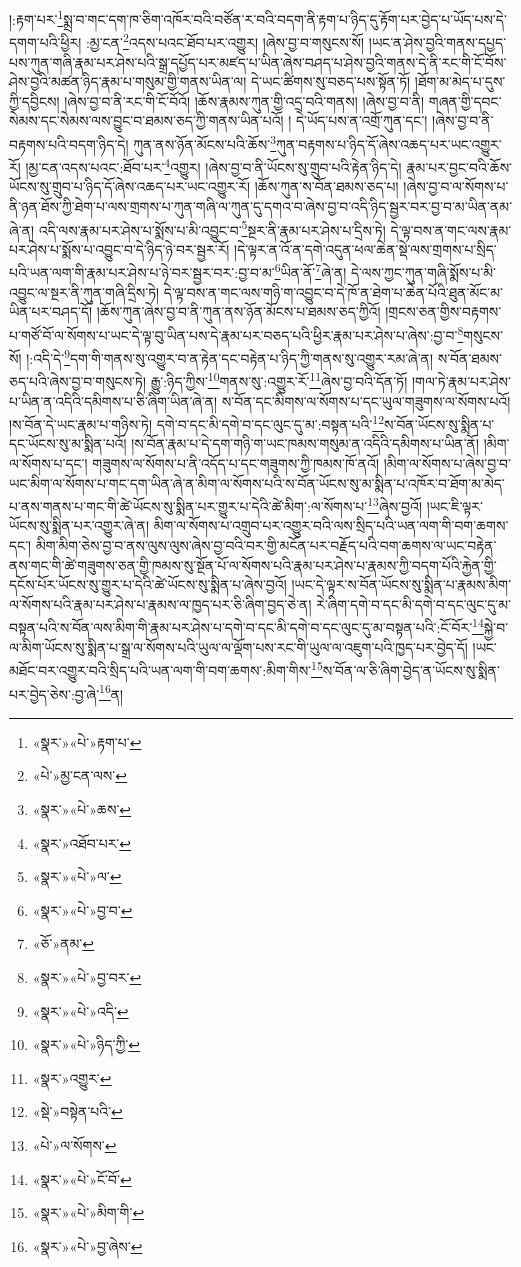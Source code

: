 །:རྟག་པར་\footnote{«སྣར་»«པེ་»རྟག་པ་}སྨྲ་བ་གང་དག་ཁ་ཅིག་འཁོར་བའི་བཙོན་ར་བའི་བདག་ནི་རྟག་པ་ཉིད་དུ་རྟོག་པར་བྱེད་པ་ཡོད་པས་དེ་དགག་པའི་ཕྱིར། :མྱ་ངན་\footnote{«པེ་»མྱ་ངན་ལས་}འདས་པའང་ཐོབ་པར་འགྱུར། །ཞེས་བྱ་བ་གསུངས་སོ། །ཡང་ན་ཤེས་བྱའི་གནས་དཔྱད་པས་ཀུན་གཞི་རྣམ་པར་ཤེས་པའི་སྒྲ་དཔྱོད་པར་མཛད་པ་ཡིན་ཞེས་བཤད་པ་ཤེས་བྱའི་གནས་དེ་ནི་རང་གི་ངོ་བོས་ཤེས་བྱའི་མཚན་ཉིད་རྣམ་པ་གསུམ་གྱི་གནས་ཡིན་ལ། དེ་ཡང་ཚིགས་སུ་བཅད་པས་སྟོན་ཏོ། །ཐོག་མ་མེད་པ་དུས་ཀྱི་དབྱིངས། །ཞེས་བྱ་བ་ནི་རང་གི་ངོ་བོའོ། །ཆོས་རྣམས་ཀུན་གྱི་འདྲ་བའི་གནས། །ཞེས་བྱ་བ་ནི། གཞན་གྱི་དབང་སེམས་དང་སེམས་ལས་བྱུང་བ་ཐམས་ཅད་ཀྱི་གནས་ཡིན་པའོ། །
དེ་ཡོད་པས་ན་འགྲོ་ཀུན་དང་། །ཞེས་བྱ་བ་ནི་བརྟགས་པའི་བདག་ཉིད་དེ། ཀུན་ནས་ཉོན་མོངས་པའི་ཆོས་\footnote{«སྣར་»«པེ་»ཆས་}ཀུན་བརྟགས་པ་ཉིད་དོ་ཞེས་འཆད་པར་ཡང་འགྱུར་རོ། །མྱ་ངན་འདས་པའང་:ཐོབ་པར་\footnote{«སྣར་»འཐོབ་པར་}འགྱུར། །ཞེས་བྱ་བ་ནི་ཡོངས་སུ་གྲུབ་པའི་རྟེན་ཉིད་དེ། རྣམ་པར་བྱང་བའི་ཆོས་ཡོངས་སུ་གྲུབ་པ་ཉིད་དོ་ཞེས་འཆད་པར་ཡང་འགྱུར་རོ། །ཆོས་ཀུན་ས་བོན་ཐམས་ཅད་པ། །ཞེས་བྱ་བ་ལ་སོགས་པ་ནི་ཉན་ཐོས་ཀྱི་ཐེག་པ་ལས་གྲགས་པ་ཀུན་གཞི་ལ་ཀུན་དུ་དགའ་བ་ཞེས་བྱ་བ་འདི་ཉིད་སྦྱར་བར་བྱ་བ་མ་ཡིན་ནམ་ཞེ་ན། འདི་ལས་རྣམ་པར་ཤེས་པ་སྨོས་པ་མི་འབྱུང་བ་\footnote{«སྣར་»«པེ་»ལ་}སྔར་ནི་རྣམ་པར་ཤེས་པ་དྲིས་ཏེ། དེ་ལྟ་བས་ན་གང་ལས་རྣམ་པར་ཤེས་པ་སྨོས་པ་འབྱུང་བ་དེ་ཉིད་ཉེ་བར་སྦྱར་རོ། །དེ་ལྟར་ན་འོ་ན་དགེ་འདུན་ཕལ་ཆེན་སྡེ་ལས་གྲགས་པ་སྲིད་པའི་ཡན་ལག་གི་རྣམ་པར་ཤེས་པ་ཉེ་བར་སྦྱར་བར་:བྱ་བ་མ་\footnote{«སྣར་»«པེ་»བྱ་བ་}ཡིན་ནོ་\footnote{«ཅོ་»ནམ་}ཞེ་ན། དེ་ལས་ཀྱང་ཀུན་གཞི་སྨོས་པ་མི་འབྱུང་ལ་སྔར་ནི་ཀུན་གཞི་དྲིས་ཏེ། དེ་ལྟ་བས་ན་གང་ལས་གཉི་ག་འབྱུང་བ་དེ་ཁོ་ན་ཐེག་པ་ཆེན་པོའི་ཐུན་མོང་མ་ཡིན་པར་བཤད་དོ། །ཆོས་ཀུན་ཞེས་བྱ་བ་ནི་ཀུན་ནས་ཉོན་མོངས་པ་ཐམས་ཅད་ཀྱིའོ། །གྲངས་ཅན་གྱིས་བརྟགས་པ་གཙོ་བོ་ལ་སོགས་པ་ཡང་དེ་ལྟ་བུ་ཡིན་པས་དེ་རྣམ་པར་བཅད་པའི་ཕྱིར་རྣམ་པར་ཤེས་པ་ཞེས་:བྱ་བ་\footnote{«སྣར་»«པེ་»བྱ་བར་}གསུངས་སོ། །:འདི་དེ་\footnote{«སྣར་»«པེ་»འདི་}དག་གི་གནས་སུ་འགྱུར་བ་ན་རྟེན་དང་བརྟེན་པ་ཉིད་ཀྱི་གནས་སུ་འགྱུར་རམ་ཞེ་ན། ས་བོན་ཐམས་ཅད་པའི་ཞེས་བྱ་བ་གསུངས་ཏེ། རྒྱུ་:ཉིད་ཀྱིས་\footnote{«སྣར་»«པེ་»ཉིད་ཀྱི་}གནས་སུ་:འགྱུར་རོ་\footnote{«སྣར་»འགྱུར་}ཞེས་བྱ་བའི་དོན་ཏོ། །གལ་ཏེ་རྣམ་པར་ཤེས་པ་ཡིན་ན་འདིའི་དམིགས་པ་ཅི་ཞིག་ཡིན་ཞེ་ན། ས་བོན་དང་མིགས་ལ་སོགས་པ་དང་ཡུལ་གཟུགས་ལ་སོགས་པའོ། །ས་བོན་དེ་ཡང་རྣམ་པ་གཉིས་ཏེ། དགེ་བ་དང་མི་དགེ་བ་དང་ལུང་དུ་མ་:བསྟན་པའི་\footnote{«སྡེ་»བསྟེན་པའི་}ས་བོན་ཡོངས་སུ་སྨིན་པ་དང་ཡོངས་སུ་མ་སྨིན་པའོ། །ས་བོན་རྣམ་པ་དེ་དག་གཉི་ག་ཡང་ཁམས་གསུམ་ན་འདིའི་དམིགས་པ་ཡིན་ནོ། །མིག་ལ་སོགས་པ་དང་། གཟུགས་ལ་སོགས་པ་ནི་འདོད་པ་དང་གཟུགས་ཀྱི་ཁམས་ཁོ་ནའོ། །མིག་ལ་སོགས་པ་ཞེས་བྱ་བ་ཡང་མིག་ལ་སོགས་པ་གང་དག་ཡིན་ཞེ་ན་མིག་ལ་སོགས་པའི་ས་བོན་ཡོངས་སུ་མ་སྨིན་པ་འཁོར་བ་ཐོག་མ་མེད་པ་ནས་གནས་པ་གང་གི་ཚེ་ཡོངས་སུ་སྨིན་པར་གྱུར་པ་དེའི་ཚེ་མིག་:ལ་སོགས་པ་\footnote{«པེ་»ལ་སོགས་}ཞེས་བྱའོ། །ཡང་ཇི་ལྟར་ཡོངས་སུ་སྨིན་པར་འགྱུར་ཞེ་ན། མིག་ལ་སོགས་པ་འགྲུབ་པར་འགྱུར་བའི་ལས་སྲིད་པའི་ཡན་ལག་གི་བག་ཆགས་དང་། མིག་མིག་ཅེས་བྱ་བ་ནས་ལུས་ལུས་ཞེས་བྱ་བའི་བར་གྱི་མངོན་པར་བརྗོད་པའི་བག་ཆགས་ལ་ཡང་བརྟེན་ནས་གང་གི་ཚེ་གཟུགས་ཅན་གྱི་ཁམས་སུ་སྔོན་པོ་ལ་སོགས་པའི་རྣམ་པར་ཤེས་པ་རྣམས་ཀྱི་བདག་པོའི་རྐྱེན་གྱི་དངོས་པོར་ཡོངས་སུ་གྱུར་པ་དེའི་ཚེ་ཡོངས་སུ་སྨིན་པ་ཞེས་བྱའོ། །ཡང་དེ་ལྟར་ས་བོན་ཡོངས་སུ་སྨིན་པ་རྣམས་མིག་ལ་སོགས་པའི་རྣམ་པར་ཤེས་པ་རྣམས་ལ་ཁྱད་པར་ཅི་ཞིག་བྱད་ཅེ་ན། རེ་ཞིག་དགེ་བ་དང་མི་དགེ་བ་དང་ལུང་དུ་མ་བསྟན་པའི་ས་བོན་ལས་མིག་གི་རྣམ་པར་ཤེས་པ་དགེ་བ་དང་མི་དགེ་བ་དང་ལུང་དུ་མ་བསྟན་པའི་:ངོ་བོར་\footnote{«སྣར་»«པེ་»ངོ་བོ་}སྐྱེ་བ་ལ་མིག་ཡོངས་སུ་སྨིན་པ་སྒྲ་ལ་སོགས་པའི་ཡུལ་ལ་ལྡོག་པས་རང་གི་ཡུལ་ལ་འཇུག་པའི་ཁྱད་པར་བྱེད་དོ། །ཡང་མཐོང་བར་འགྱུར་བའི་སྲིད་པའི་ཡན་ལག་གི་བག་ཆགས་:མིག་གིས་\footnote{«སྣར་»«པེ་»མིག་གི་}ས་བོན་ལ་ཅི་ཞིག་བྱེད་ན་ཡོངས་སུ་སྨིན་པར་བྱེད་ཅེས་:བྱ་ཞེ་\footnote{«སྣར་»«པེ་»བྱ་ཞེས་}ན། 